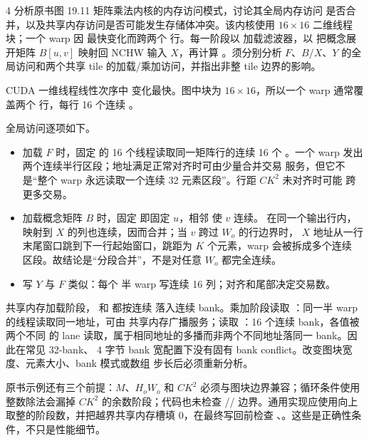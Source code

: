 \begin{solutionexercise}{4}
\problemheading 分析原书图 19.11 矩阵乘法内核的内存访问模式，讨论其全局内存访问
是否合并，以及共享内存访问是否可能发生存储体冲突。该内核使用
$16\times16$ 二维线程块；一个 warp 因  最快变化而跨两个
 行。每一阶段以
 加载滤波器，以
 把概念展开矩阵 $B[u,v]$ 映射回 NCHW 输入 $X$，再计算
。须分别分析 $F$、$B/X$、$Y$ 的全局访问和两个共享 tile
的加载/乘加访问，并指出非整 tile 边界的影响。

\approachheading CUDA 一维线程线性次序中  变化最快。图中块为
$16\times16$，所以一个 warp 通常覆盖两个  行，每行 16 个连续 。

\answerheading 全局访问逐项如下。
\begin{itemize}
  \item 加载 $F$ 时，固定  的 16 个线程读取同一矩阵行的连续 16 个
  。一个 warp 发出两个连续半行区段；地址满足正常对齐时可由少量合并交易
  服务，但它不是“整个 warp 永远读取一个连续 32 元素区段”。行距 $CK^2$ 未对齐时可能
  跨更多交易。
  \item 加载概念矩阵 $B$ 时，固定  即固定 $u$，相邻  使 $v$ 连续。
  在同一个输出行内，映射到 $X$ 的列也连续，因而合并；当 $v$ 跨过 $W_o$ 的行边界时，
  $X$ 地址从一行末尾窗口跳到下一行起始窗口，跳距为 $K$ 个元素，warp 会被拆成多个连续
  区段。故结论是“分段合并”，不是对任意 $W_o$ 都完全连续。
  \item 写 $Y$ 与 $F$ 类似：每个  半 warp 写连续 16 列；对齐和尾部决定交易数。
\end{itemize}

共享内存加载阶段， 和  都按连续 
落入连续 bank。乘加阶段读取 ：同一半 warp 的线程读取同一地址，可由
共享内存广播服务；读取 ：16 个连续 bank，各值被两个不同 
的 lane 读取，属于相同地址的多播而非两个不同地址落同一 bank。因此在常见 32-bank、
4 字节 bank 宽配置下没有固有 bank conflict。改变图块宽度、元素大小、bank 模式或数组
步长后必须重新分析。

原书示例还有三个前提：$M$、$H_oW_o$ 和 $CK^2$ 必须与图块边界兼容；循环条件使用
整数除法会漏掉 $CK^2$ 的余数阶段；代码也未检查 //
边界。通用实现应使用向上取整的阶段数，并把越界共享内存槽填 0，在最终写回前检查
、。这些是正确性条件，不只是性能细节。


\end{solutionexercise}
